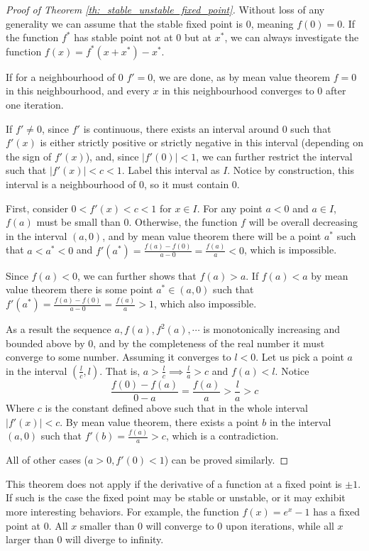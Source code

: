 \begin{proof}[Proof of Theorem \ref{th:_stable_unstable_fixed_point}]
	Without loss of any generality we can assume that the stable fixed point is $0$, meaning $f(0) = 0$. 
	If the function $f^*$ has stable point not at $0$ but at $x^*$, we can always investigate the function $f(x) = f^*(x+x^*) - x^*$. 
	
	If for a neighbourhood of $0$ $f' = 0$, we are done, as by mean value theorem $f = 0$ in this neighbourhood, and every $x$ in this neighbourhood converges to $0$ after one iteration.

	If $f' \neq 0$, since $f'$ is continuous, there exists an interval around $0$ such that $f'(x)$ is either strictly positive or strictly negative in this interval (depending on the sign of $f'(x)$), and, since $|f'(0)| < 1$, we can further restrict the interval such that $|f'(x)| < c < 1$. 
	Label this interval as $I$. 
	Notice by construction, this interval is a neighbourhood of $0$, so it must contain $0$.
	
	First, consider $0 < f'(x) < c < 1$ for $x \in I$. 
	For any point $a<0$ and $a\in I$,  $f(a)$ must be small than $0$. 
	Otherwise, the function $f$ will be overall decreasing in the interval $(a, 0)$, and by mean value theorem there will be a point $a^*$ such that $a < a^* < 0$ and $f'(a^*) = \frac{f(a) - f(0)}{a - 0} = \frac{f(a)}{a} < 0$, which is impossible.

	Since $f(a) < 0$, we can further shows that $f(a) > a$. 
	If $f(a) < a$ by mean value theorem there is some point $a^* \in (a, 0)$ such that $f'(a^*) = \frac{f(a) - f(0)}{a - 0} = \frac{f(a)}{a} > 1$, which also impossible.

	As a result the sequence $a, f(a), f^2(a), \cdots$ is monotonically increasing and bounded above by $0$, and by the completeness of the real number it must converge to some number. 
	Assuming it converges to $l < 0$. 
	Let us pick a point $a$ in the interval $(\frac{l}{c}, l)$. 
	That is, $a > \frac{l}{c} \implies \frac{l}{a} > c$ and $f(a) < l$.
	Notice 
	$$
	\frac{f(0) - f(a)}{0 - a} = \frac{f(a)}{a} > \frac{l}{a} > c
	$$
	Where $c$ is the constant defined above such that in the whole interval $|f'(x)| < c$.
	By mean value theorem, there exists a point $b$ in the interval $(a, 0)$ such that $f'(b) = \frac{f(a)}{a} > c$, which is a contradiction.

	All of other cases ($a > 0, f'(0) < 1$) can be proved similarly.
\end{proof}

This theorem does not apply if the derivative of a function at a fixed point is $\pm 1$.
If such is the case the fixed point may be stable or unstable, or it may exhibit more interesting behaviors.
For example, the function $f(x) = e^x - 1$ has a fixed point at $0$.
All $x$ smaller than $0$ will converge to $0$ upon iterations, while all $x$ larger than $0$ will diverge to infinity.

